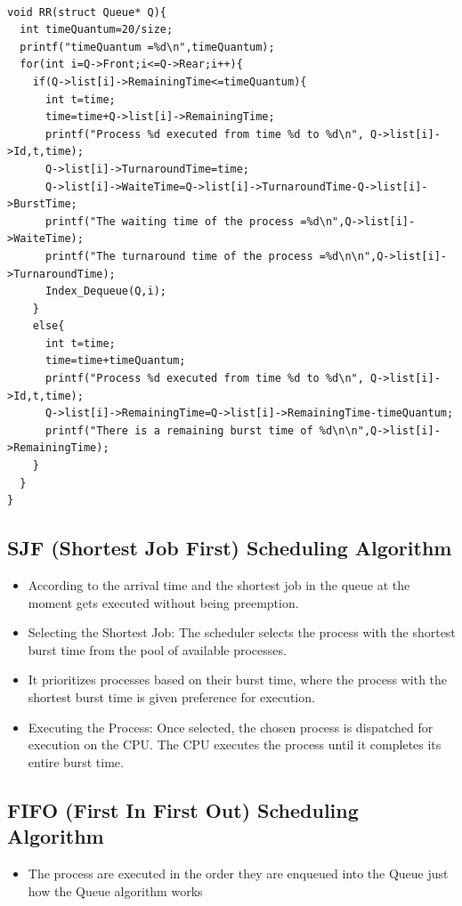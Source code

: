 \documentclass{article}
\begin{document}
\begin{lstlisting}[basicstyle=\footnotesize]

void RR(struct Queue* Q){ 
  int timeQuantum=20/size;
  printf("timeQuantum =%d\n",timeQuantum);
  for(int i=Q->Front;i<=Q->Rear;i++){
    if(Q->list[i]->RemainingTime<=timeQuantum){
      int t=time;
      time=time+Q->list[i]->RemainingTime;
      printf("Process %d executed from time %d to %d\n", Q->list[i]->Id,t,time);
      Q->list[i]->TurnaroundTime=time;
      Q->list[i]->WaiteTime=Q->list[i]->TurnaroundTime-Q->list[i]->BurstTime;
      printf("The waiting time of the process =%d\n",Q->list[i]->WaiteTime);
      printf("The turnaround time of the process =%d\n\n",Q->list[i]->TurnaroundTime);
      Index_Dequeue(Q,i);
    } 
    else{
      int t=time;
      time=time+timeQuantum;
      printf("Process %d executed from time %d to %d\n", Q->list[i]->Id,t,time);
      Q->list[i]->RemainingTime=Q->list[i]->RemainingTime-timeQuantum;
      printf("There is a remaining burst time of %d\n\n",Q->list[i]->RemainingTime);
    }   
  }
}
\end{lstlisting}

\vspace{\baselineskip}
\subsection{SJF (Shortest Job First) Scheduling Algorithm}
\begin{itemize}
    \item According to the arrival time and the shortest job in the queue at the moment gets executed without being preemption.
    \item Selecting the Shortest Job: The scheduler selects the process with the shortest burst time from the pool of available processes.
    \item It prioritizes processes based on their burst time, where the process with the shortest burst time is given preference for execution.
    \item Executing the Process: Once selected, the chosen process is dispatched for execution on the CPU. The CPU executes the process until it completes its entire burst time.
\end{itemize}
\vspace{\baselineskip}
\subsection{FIFO (First In First Out) Scheduling Algorithm}
\begin{itemize}
    \item The process are executed in the order they are enqueued into the Queue just how the Queue algorithm works
\end{itemize}
\end{document}
